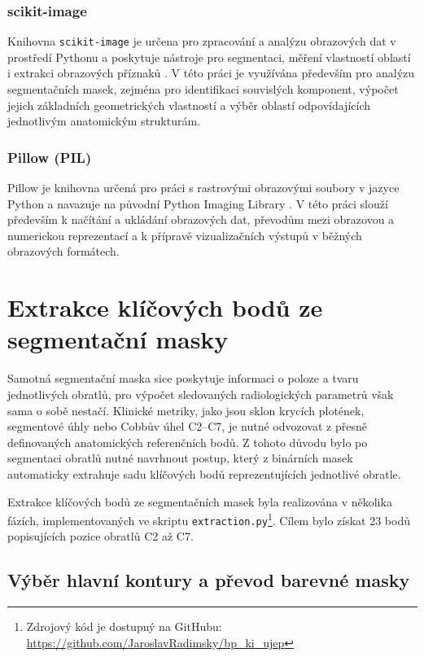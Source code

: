 \documentclass[male,czech,api_bc]{kitheses}
\begin{document}
\subsection*{scikit-image}
Knihovna \texttt{scikit-image} je určena pro zpracování a analýzu obrazových dat v prostředí Pythonu a poskytuje nástroje pro segmentaci, měření vlastností oblastí i extrakci obrazových příznaků \cite{VanDerWalt2014Skimage}. V této práci je využívána především pro analýzu segmentačních masek, zejména pro identifikaci souvislých komponent, výpočet jejich základních geometrických vlastností a výběr oblastí odpovídajících jednotlivým anatomickým strukturám.

\subsection*{Pillow (PIL)}
Pillow je knihovna určená pro práci s rastrovými obrazovými soubory v jazyce Python a navazuje na původní Python Imaging Library \cite{PillowDocs}. V této práci slouží především k načítání a ukládání obrazových dat, převodům mezi obrazovou a numerickou reprezentací a k přípravě vizualizačních výstupů v běžných obrazových formátech.

\chapter{Extrakce klíčových bodů ze segmentační masky}
\label{chap:extraction}

Samotná segmentační maska sice poskytuje informaci o poloze a tvaru jednotlivých obratlů, pro výpočet sledovaných radiologických parametrů však sama o sobě nestačí. Klinické metriky, jako jsou sklon krycích plotének, segmentové úhly nebo Cobbův úhel C2--C7, je nutné odvozovat z přesně definovaných anatomických referenčních bodů. Z tohoto důvodu bylo po segmentaci obratlů nutné navrhnout postup, který z binárních masek automaticky extrahuje sadu klíčových bodů reprezentujících jednotlivé obratle.

Extrakce klíčových bodů ze segmentačních masek byla realizována v několika fázích, implementovaných ve skriptu \texttt{extraction.py}\footnote{Zdrojový kód je dostupný na GitHubu: \url{https://github.com/JaroslavRadimsky/bp_ki_ujep}}. Cílem bylo získat 23 bodů popisujících pozice obratlů C2 až C7.


\section{Výběr hlavní kontury a převod barevné masky}
\label{sec:mask_color_conversion}
\end{document}

